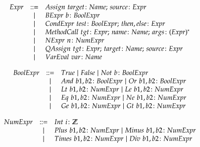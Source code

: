 \documentclass[a4paper,10pt]{article}
\begin{document}
\begin{displaymath}
\begin{array}[l]{lcl}
Expr  & \geqdef & Assign\,\, target \gcolon Name\gsemi source \gcolon
Expr\\
            & \gbar   & BExpr\,\, b \gcolon BoolExpr\\
            & \gbar   & CondExpr\,\, test \gcolon BoolExpr\gsemi then,else \gcolon Expr\\
            & \gbar   & MethodCall\,\, tgt \gcolon Expr \gsemi name \gcolon Name\gsemi args\gcolon
(Expr)^*\\
            & \gbar   & NExpr\,\, n \gcolon NumExpr \\ 
            & \gbar   & QAssign\,\, tgt \gcolon Expr \gsemi target \gcolon Name\gsemi source \gcolon
Expr\\
            & \gbar   & VarEval\,\, var \gcolon Name\\              
\end{array}
\end{displaymath}

\begin{displaymath}
\begin{array}[l]{lcl}
BoolExpr        & \geqdef & True \gbar False \gbar Not\,\, b \gcolon BoolExpr\\
                & \gbar   & And\,\, b1, b2 \gcolon BoolExpr \gbar Or\,\, b1, b2 \gcolon BoolExpr\\
                & \gbar   & Lt\,\, b1, b2 \gcolon NumExpr \gbar Le\,\, b1, b2 \gcolon NumExpr\\
                & \gbar   & Eq\,\, b1, b2 \gcolon NumExpr \gbar Ne\,\, b1, b2 \gcolon NumExpr\\
                & \gbar   & Ge\,\, b1, b2 \gcolon NumExpr \gbar Gt\,\, b1, b2 \gcolon NumExpr\\
\end{array}
\end{displaymath}

\begin{displaymath}
\begin{array}[l]{lcl}
NumExpr         & \geqdef & Int\,\, i \gcolon \Integer\\
                & \gbar   & Plus\,\, b1, b2 \gcolon NumExpr \gbar Minus\,\, b1, b2 \gcolon NumExpr\\
                & \gbar   & Times\,\, b1, b2 \gcolon NumExpr \gbar Div\,\, b1, b2 \gcolon NumExpr\\
\end{array}
\end{displaymath}
\end{document}
